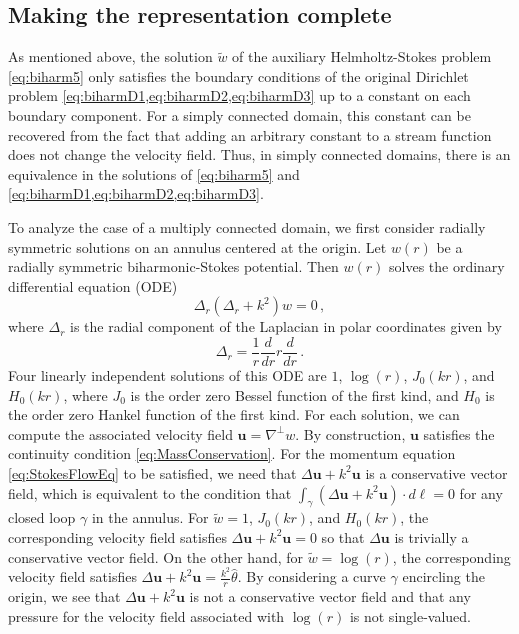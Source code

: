 \documentclass[preprint,12pt]{article}
\def\bu{{\boldsymbol u}}
\def\bl{{\boldsymbol \ell}}
\begin{document}
\subsection{Making the representation complete}
As mentioned above, the solution $\tilde{w}$ of 
the auxiliary Helmholtz-Stokes problem \cref{eq:biharm5}
only satisfies the boundary conditions of the 
original Dirichlet problem \cref{eq:biharmD1,eq:biharmD2,eq:biharmD3}
up to a constant on each boundary component. For a simply
connected domain, this constant can be recovered from the
fact that adding an arbitrary constant to a stream function
does not change the velocity field. 
Thus, in simply connected domains, there is an equivalence in the 
solutions of \cref{eq:biharm5} and \cref{eq:biharmD1,eq:biharmD2,eq:biharmD3}.

To analyze the case of a multiply connected domain,
we first consider
radially symmetric solutions on an annulus centered at the
origin. Let $w\left(r\right)$ be a 
radially symmetric biharmonic-Stokes
potential. Then $w(r)$ solves the ordinary differential
equation (ODE)
\begin{equation}
\Delta_{r} (\Delta_{r} + k^2)w = 0 \, ,
\end{equation}
where $\Delta_{r}$ is the radial component of the Laplacian in polar
coordinates given by
$$
\Delta_{r} = \frac{1}{r}\frac{d}{dr} r \frac{d}{dr} \, .
$$
Four linearly independent solutions of this ODE are $1$, $\log{(r)}$, 
$J_{0}(kr)$, and $H_{0}(kr)$, 
where $J_{0}$ is the order zero Bessel function of the first kind, and $H_{0}$ is the order zero Hankel function of the first kind.
For each solution, we can compute the associated velocity field 
$\bu = \nabla^{\perp} w$. By construction, $\bu$ satisfies 
the continuity condition \cref{eq:MassConservation}. 
For the momentum equation \cref{eq:StokesFlowEq} to be 
satisfied, we need that $\Delta\bu + k^2 \bu$ is a conservative
vector field, which 
is equivalent to the condition that 
$\int_{\gamma} (\Delta\bu + k^2 \bu) \cdot d\bl = 0$ 
for any closed 
loop $\gamma$ in the annulus. For $\tilde{w}=1$, $J_{0}(kr)$, and $H_{0}(kr)$,
the corresponding velocity field satisfies
$\Delta \bu + k^2 \bu=0$ so that $\Delta \bu$
is trivially a conservative vector field. 
On the other hand, for $\tilde{w}=\log{(r)}$, the corresponding velocity field
satisfies $\Delta \bu + k^2 \bu=\frac{k^2}{r} \hat{\theta}$.
By considering a curve $\gamma$ encircling the origin,
we see that $\Delta \bu + k^2 \bu$ is not a conservative vector
field and that any pressure for the velocity field 
associated with $\log\left(r\right)$ is not single-valued.
\end{document}
